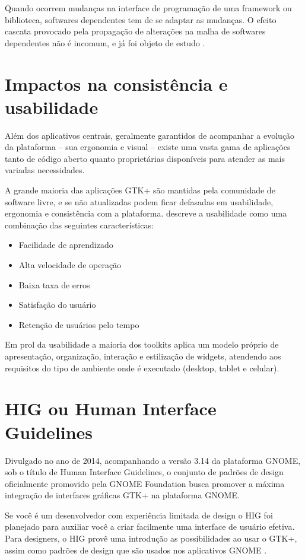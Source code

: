 Quando ocorrem mudanças na interface de programação de uma framework ou
biblioteca, softwares dependentes tem de se adaptar as mudanças. O efeito
cascata provocado pela propagação de alterações na malha de softwares
dependentes não é incomum, e já foi objeto de estudo \cite{yau1978ripple}.

\section{Impactos na consistência e usabilidade}

Além dos aplicativos centrais, geralmente garantidos de acompanhar a evolução
da plataforma -- sua ergonomia e visual -- existe uma vasta gama de aplicações
tanto de código aberto quanto proprietárias disponíveis para atender as mais
variadas necessidades.

A grande maioria das aplicações GTK+ são mantidas pela comunidade de software
livre, e se não atualizadas podem ficar defasadas em usabilidade, ergonomia e
consistência com a plataforma.  descreve
a usabilidade como uma combinação das seguintes características:

\begin{itemize}
    \item Facilidade de aprendizado
    \item Alta velocidade de operação
    \item Baixa taxa de erros
    \item Satisfação do usuário
    \item Retenção de usuários pelo tempo
\end{itemize}

Em prol da usabilidade a maioria dos toolkits aplica um modelo próprio de
apresentação, organização, interação e estilização de widgets, atendendo aos
requisitos do tipo de ambiente onde é executado (desktop, tablet e celular).

\section{HIG ou Human Interface Guidelines}

Divulgado no ano de 2014, acompanhando a versão 3.14 da plataforma GNOME, sob o
título de Human Interface Guidelines, o conjunto de padrões de design
oficialmente promovido pela GNOME Foundation busca promover a máxima integração
de interfaces gráficas GTK+ na plataforma GNOME.

\begin{citacao}
    Se você é um desenvolvedor com experiência limitada de design o HIG foi
    planejado para auxiliar você a criar facilmente uma interface de usuário
    efetiva. Para designers, o HIG provê uma introdução as possibilidades ao
    usar o GTK+, assim como padrões de design que são usados nos aplicativos
    GNOME \cite{gnome314hig}.
\end{citacao}


